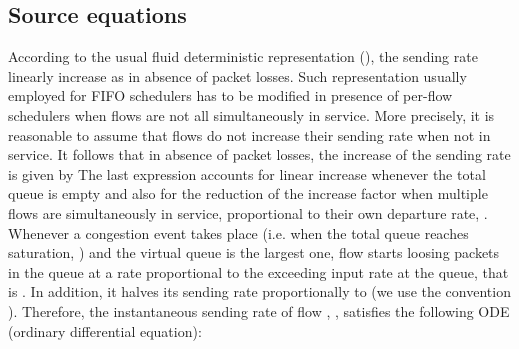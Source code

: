 \documentclass[a4paper,oneside, 11pt]{article}
\begin{document}
\subsection{Source equations}\label{subsec:sources}
According to the usual fluid deterministic representation
(\cite{ajmone,baccelli,carofiglioSplit}),
the sending rate linearly increase as  in absence of packet losses.
Such representation usually employed for FIFO schedulers has to be modified in presence of per-flow schedulers when flows are not all simultaneously in service.
More precisely, it is reasonable to assume that flows do not increase their sending rate when not in service. It follows that in absence of packet losses, the increase
of the sending rate is given by 
The last expression accounts for linear increase whenever the total queue is empty and also for the reduction of the increase factor when multiple flows are simultaneously in service, proportional to their own departure rate,
.\\
Whenever a congestion event takes place (i.e. when the total queue  reaches saturation, ) and the virtual queue  is the largest one, flow  starts loosing packets in the queue at a rate proportional to the exceeding input rate at the queue, that is .
In addition, it halves its sending rate  proportionally to  (we use the convention ).
Therefore, the instantaneous sending rate of flow , , satisfies the following ODE (ordinary differential equation):
\end{document}

